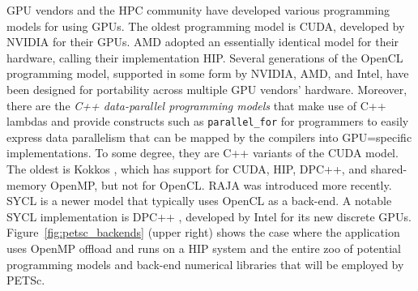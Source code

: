 \documentclass[5p,times]{elsarticle}
\begin{document}
GPU vendors and the HPC
community have developed various programming models
for using GPUs. The oldest %
programming model is CUDA, developed by NVIDIA for their GPUs. AMD adopted
an essentially identical model for their hardware, calling their implementation
HIP. Several generations of the OpenCL programming
model, supported in some form by NVIDIA, AMD, and Intel,
have been designed for portability across multiple GPU vendors' hardware.
Moreover, there are the
\emph{C++ data\hyp{}parallel programming models} that make use of C++
lambdas and provide constructs such as {\tt parallel\_for} for programmers to
easily express data parallelism that can be mapped by the compilers into GPU=specific implementations. To some degree, they are C++
variants of the CUDA model. The oldest is Kokkos \cite{KOKKOS}, which has support for
CUDA, HIP, DPC++, and shared-memory OpenMP, but not for OpenCL.  RAJA \cite{RAJA} was introduced
more recently. SYCL \cite{SYCL} is a newer model that typically uses OpenCL as
a back-end. A notable SYCL implementation is DPC++ \cite{DPC++}, developed
by Intel for its new discrete GPUs.
Figure~\ref{fig:petsc_backends} (upper right) shows the case where the application
uses OpenMP offload and runs on a HIP system and
the entire zoo of potential programming models and back-end numerical
libraries that will be employed by PETSc.

\end{document}
